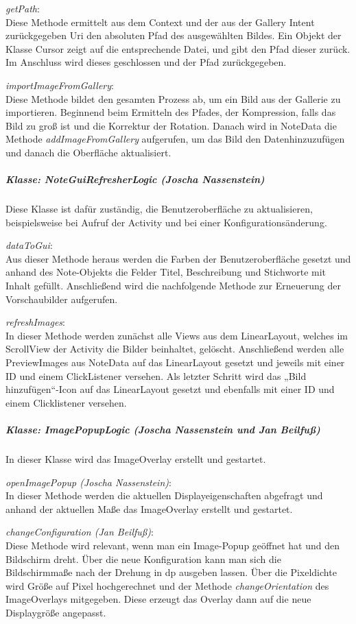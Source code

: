 \textit{getPath}:\\
Diese Methode ermittelt aus dem Context und der aus der Gallery Intent zurückgegeben Uri den absoluten Pfad des ausgewählten Bildes. Ein Objekt der Klasse Cursor zeigt auf die entsprechende Datei, und gibt den Pfad dieser zurück. Im Anschluss wird dieses geschlossen und der Pfad zurückgegeben.

\textit{importImageFromGallery}:\\
Diese Methode bildet den gesamten Prozess ab, um ein Bild aus der Gallerie zu importieren. Beginnend beim Ermitteln des Pfades, der Kompression, falls das Bild zu groß ist und die Korrektur der Rotation. Danach wird in NoteData die Methode \textit{addImageFromGallery} aufgerufen, um das Bild den Datenhinzuzufügen und danach die Oberfläche aktualisiert.

\subparagraph*{Klasse: NoteGuiRefresherLogic (Joscha Nassenstein)}
Diese Klasse ist dafür zuständig, die Benutzeroberfläche zu aktualisieren, beispielsweise bei Aufruf der Activity und bei einer Konfigurationsänderung.

\textit{dataToGui}:\\
Aus dieser Methode heraus werden die Farben der Benutzeroberfläche gesetzt und anhand des Note-Objekts die Felder Titel, Beschreibung und Stichworte mit Inhalt gefüllt. Anschließend wird die nachfolgende Methode zur Erneuerung der Vorschaubilder aufgerufen.

\textit{refreshImages}:\\
In dieser Methode werden zunächst alle Views aus dem LinearLayout, welches im ScrollView der Activity die Bilder beinhaltet, gelöscht. Anschließend werden alle PreviewImages aus NoteData auf das LinearLayout gesetzt und jeweils mit einer ID und einem ClickListener versehen. Als letzter Schritt wird das „Bild hinzufügen“-Icon auf das LinearLayout gesetzt und ebenfalls mit einer ID und einem Clicklistener versehen.

\subparagraph*{Klasse: ImagePopupLogic (Joscha Nassenstein und Jan Beilfuß)}
In dieser Klasse wird das ImageOverlay erstellt und gestartet.

\textit{openImagePopup (Joscha Nassenstein)}:\\
In dieser Methode werden die aktuellen Displayeigenschaften abgefragt und anhand der aktuellen Maße das ImageOverlay erstellt und gestartet.

\textit{changeConfiguration (Jan Beilfuß)}:\\
Diese Methode wird relevant, wenn man ein Image-Popup geöffnet hat und den Bildschirm dreht. Über die neue Konfiguration kann man sich die Bildschirmmaße nach der Drehung in dp ausgeben lassen. Über die Pixeldichte wird Größe auf Pixel hochgerechnet und der Methode \textit{changeOrientation} des ImageOverlays mitgegeben. Diese erzeugt das Overlay dann auf die neue Displaygröße angepasst.

